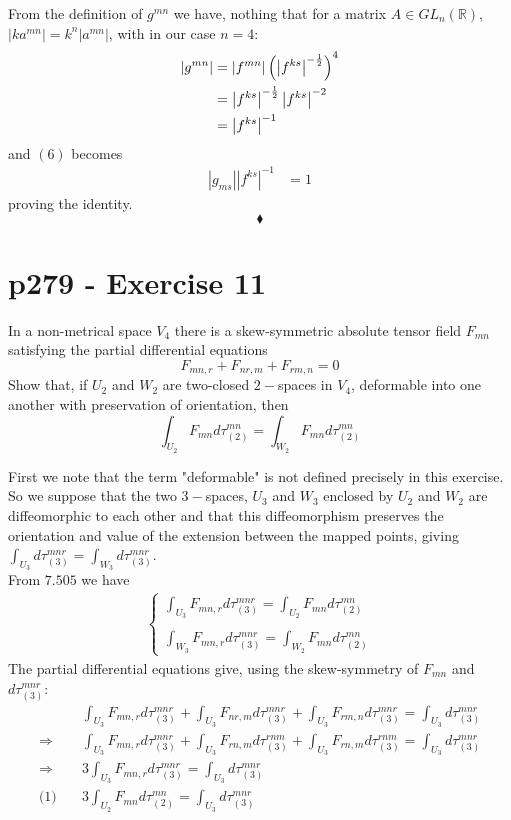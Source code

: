 From the definition of $g^{mn}$ we have, nothing that for a matrix $A \in GL_n(\mathbb{R})$, $\left|k a^{mn}\right| = k^n \left| a^{mn}\right|$, with in our case $n=4$:
\begin{align}
\left|g^{mn}\right| &= \left|f^{mn}\right|\left(\left|f^{ks}\right|^{-\frac{1}{2}}\right)^4\\
&=\left|f^{ks}\right|^{-\frac{1}{2}}\left|f^{ks}\right|^{-2}\\
&= \left|f^{ks}\right|^{-1}
\end{align}
and $(6)$ becomes
\begin{align}
\left|g_{ms}\right|\left|f^{ks}\right|^{-1}&= 1
\end{align}
proving the identity.
$$\blacklozenge$$
\newpage


\section{p279 - Exercise 11}
\begin{tcolorbox}
In a non-metrical space $V_4$ there is a skew-symmetric absolute tensor field $F_{mn}$ satisfying the partial differential equations
$$F_{mn,r}+F_{nr,m}+F_{rm,n}=0$$
Show that, if $U_2$ and $W_2$ are two-closed $2-$spaces in $V_4$, deformable into one another with preservation of orientation, then
$$\int_{U_2}F_{mn}d\tau_{(2)}^{mn} = \int_{W_2}F_{mn}d\tau_{(2)}^{mn} $$
\end{tcolorbox}
First we note that the term "deformable" is not defined precisely in this exercise. So we suppose that the two $3-$spaces, $U_3$ and $W_3$ enclosed by $U_2$ and $W_2$ are diffeomorphic to each other and that this diffeomorphism preserves the orientation and value of the extension between the mapped points, giving $\int_{U_3} d\tau_{(3)}^{mnr}=\int_{W_3}d\tau_{(3)}^{mnr}$. \\
From $\mathbf{7.505}$ we have
\begin{align}
\left\{\begin{array}{l}\int_{U_3} F_{mn,r}d\tau_{(3)}^{mnr} = \int_{U_2} F_{mn}d\tau_{(2)}^{mn}\\\\
\int_{W_3} F_{mn,r}d\tau_{(3)}^{mnr} = \int_{W_2} F_{mn}d\tau_{(2)}^{mn}
\end{array}\right.
\end{align}
The partial differential equations give, using the skew-symmetry of $F_{mn}$ and $d\tau_{(3)}^{mnr}$:
\begin{align}
&\int_{U_3} F_{mn,r}d\tau_{(3)}^{mnr}+\int_{U_3} F_{nr,m}d\tau_{(3)}^{mnr}+\int_{U_3} F_{rm,n}d\tau_{(3)}^{mnr}= \int_{U_3} d\tau_{(3)}^{mnr}\\
\Rightarrow \quad &\int_{U_3} F_{mn,r}d\tau_{(3)}^{mnr}+\int_{U_3} F_{rn,m}d\tau_{(3)}^{rnm}+\int_{U_3} F_{rn,m}d\tau_{(3)}^{rnm}= \int_{U_3} d\tau_{(3)}^{mnr}\\
\Rightarrow \quad &3\int_{U_3} F_{mn,r}d\tau_{(3)}^{mnr}= \int_{U_3} d\tau_{(3)}^{mnr}\\
\text{(1)} \quad &3\int_{U_2} F_{mn}d\tau_{(2)}^{mn}= \int_{U_3} d\tau_{(3)}^{mnr}
\end{align}
